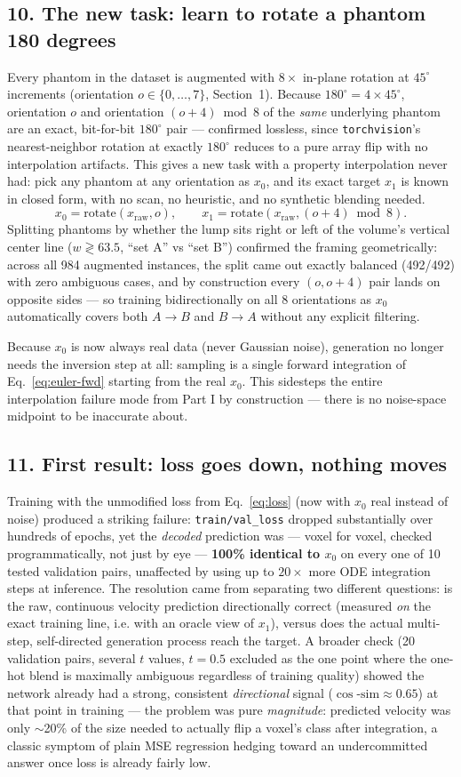 \documentclass[11pt]{article}
\newcommand{\hsub}[1]{\subsection*{#1}}
\begin{document}
\hsub{10. The new task: learn to rotate a phantom 180 degrees}
Every phantom in the dataset is augmented with $8\times$ in-plane rotation at $45^\circ$
increments (orientation $o \in \{0,\dots,7\}$, Section~1). Because $180^\circ = 4\times45^\circ$,
orientation $o$ and orientation $(o+4)\bmod 8$ of the \emph{same} underlying phantom are an
exact, bit-for-bit $180^\circ$ pair --- confirmed lossless, since \texttt{torchvision}'s
nearest-neighbor rotation at exactly $180^\circ$ reduces to a pure array flip with no
interpolation artifacts. This gives a new task with a property interpolation never had: pick
any phantom at any orientation as $x_0$, and its exact target $x_1$ is known in closed form,
with no scan, no heuristic, and no synthetic blending needed.
\begin{equation}
x_0 = \text{rotate}(x_{\text{raw}}, o), \qquad x_1 = \text{rotate}(x_{\text{raw}}, (o+4)\bmod 8).
\label{eq:rotate180-pair}
\end{equation}
Splitting phantoms by whether the lump sits right or left of the volume's vertical center
line ($w \gtrless 63.5$, ``set A'' vs ``set B'') confirmed the framing geometrically: across
all 984 augmented instances, the split came out exactly balanced (492/492) with zero
ambiguous cases, and by construction every $(o, o{+}4)$ pair lands on opposite sides --- so
training bidirectionally on all 8 orientations as $x_0$ automatically covers both
$A\!\to\!B$ and $B\!\to\!A$ without any explicit filtering.

Because $x_0$ is now always real data (never Gaussian noise), generation no longer needs the
inversion step at all: sampling is a single forward integration of
Eq.~\eqref{eq:euler-fwd} starting from the real $x_0$. This sidesteps the entire
interpolation failure mode from Part I by construction --- there is no noise-space midpoint
to be inaccurate about.

\hsub{11. First result: loss goes down, nothing moves}
Training with the unmodified loss from Eq.~\eqref{eq:loss} (now with $x_0$ real instead of
noise) produced a striking failure: \texttt{train/val\_loss} dropped substantially over
hundreds of epochs, yet the \emph{decoded} prediction was --- voxel for voxel, checked
programmatically, not just by eye --- \textbf{100\% identical to $x_0$} on every one of 10
tested validation pairs, unaffected by using up to $20\times$ more ODE integration steps at
inference. The resolution came from separating two different questions: is the raw,
continuous velocity prediction directionally correct (measured \emph{on} the exact training
line, i.e. with an oracle view of $x_1$), versus does the actual multi-step, self-directed
generation process reach the target. A broader check (20 validation pairs, several $t$ values,
$t=0.5$ excluded as the one point where the one-hot blend is maximally ambiguous regardless of
training quality) showed the network already had a strong, consistent \emph{directional}
signal ($\cos\text{-sim}\approx 0.65$) at that point in training --- the problem was pure
\emph{magnitude}: predicted velocity was only $\sim$20\% of the size needed to actually flip a
voxel's class after integration, a classic symptom of plain MSE regression hedging toward an
undercommitted answer once loss is already fairly low.
\end{document}
